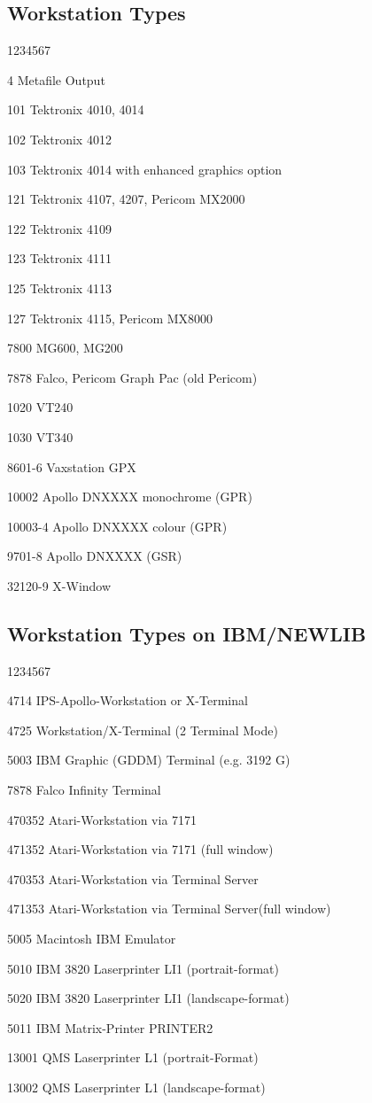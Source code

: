 \subsection{\GKSGRAL{} Workstation Types}
\begin{DLtt}{1234567}
\item[4]       Metafile Output
\item[101]     Tektronix 4010, 4014
\item[102]     Tektronix 4012
\item[103]     Tektronix 4014 with enhanced graphics option
\item[121]     Tektronix 4107, 4207, Pericom MX2000
\item[122]     Tektronix 4109
\item[123]     Tektronix 4111
\item[125]     Tektronix 4113
\item[127]     Tektronix 4115, Pericom MX8000
\item[7800]    MG600, MG200
\item[7878]    Falco, Pericom Graph Pac (old Pericom)
\item[1020]    VT240
\item[1030]    VT340
\item[8601-6]  Vaxstation GPX
\item[10002]   Apollo DNXXXX monochrome (GPR)
\item[10003-4] Apollo DNXXXX colour (GPR)
\item[9701-8]  Apollo DNXXXX (GSR)
\item[32120-9] X-Window
\end{DLtt}

\subsection{\GKSGRAL{} Workstation Types on IBM/NEWLIB}
\begin{DLtt}{1234567}
\item[4714]   IPS-Apollo-Workstation  or  X-Terminal
\item[4725]   Workstation/X-Terminal (2 Terminal Mode)
\item[5003]   IBM Graphic (GDDM) Terminal (e.g. 3192 G)
\item[7878]   Falco Infinity Terminal
\item[470352] Atari-Workstation via 7171
\item[471352] Atari-Workstation via 7171 (full window)
\item[470353] Atari-Workstation via Terminal Server
\item[471353] Atari-Workstation via Terminal Server(full window)
\item[5005]   Macintosh IBM Emulator
\item[5010]   IBM 3820 Laserprinter LI1 (portrait-format)
\item[5020]   IBM 3820 Laserprinter LI1 (landscape-format)
\item[5011]   IBM Matrix-Printer PRINTER2
\item[13001]  QMS Laserprinter L1 (portrait-Format)
\item[13002]  QMS Laserprinter L1 (landscape-format)
\end{DLtt}

